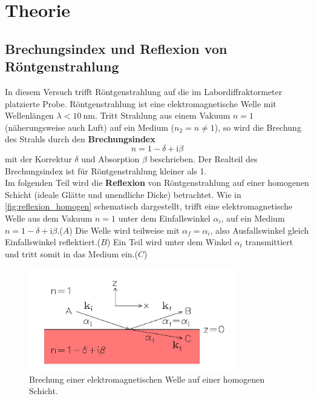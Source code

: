 \section{Theorie}
\label{sec:theorie}
\subsection{Brechungsindex und Reflexion von Röntgenstrahlung}
In diesem Versuch trifft Röntgenstrahlung auf die im Labordiffraktormeter platzierte Probe.
Röntgenstrahlung ist eine elektromagnetische Welle mit Wellenlängen $\lambda < \SI{10}{\nano\metre}$.
Tritt Strahlung aus einem Vakuum $n = 1$ (näherungsweise auch Luft) auf ein Medium ($n_2 = n \neq 1$), so wird die Brechung des Strahls durch den \textbf{Brechungsindex}
\begin{equation}
    n = 1 - \delta + \mathrm{i} \beta
    \label{eqn:brechungsindex}
\end{equation}
mit der Korrektur $\delta$ und Absorption $\beta$ beschrieben.
Der Realteil des Brechungsindex ist für Röntgenstrahlung kleiner als 1.
\\
Im folgenden Teil wird die \textbf{Reflexion} von Röntgenstrahlung auf einer homogenen Schicht (ideale Glätte und unendliche Dicke) betrachtet.
Wie in \autoref{fig:reflexion_homogen} schematisch dargestellt, trifft eine elektromagnetische Welle aus dem Vakuum $n=1$ unter dem Einfallswinkel $\alpha_i$, auf ein Medium $n = 1 - \delta + \mathrm{i} \beta$.($A$)
Die Welle wird teilweise mit $\alpha_f = \alpha_i$, also Ausfallswinkel gleich Einfallswinkel reflektiert.($B$)
Ein Teil wird unter dem Winkel $\alpha_t$ transmittiert und tritt somit in das Medium ein.($C$)
\begin{figure}
    \centering
    \includegraphics[width=0.8\textwidth]{content/data/reflexion_homogen.jpg}
    \caption{Brechung einer elektromagnetischen Welle auf einer homogenen Schicht.\cite[4]{alte_anleitung}}
    \label{fig:reflexion_homogen}
\end{figure}
\FloatBarrier
